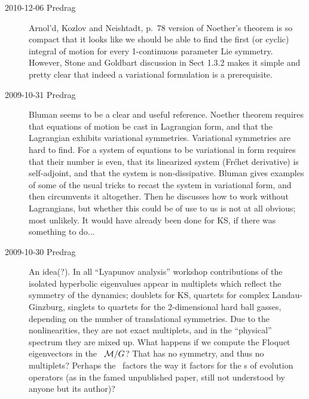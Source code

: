 \begin{description}
\item[2010-12-06 Predrag]
Arnol'd, Kozlov and Neishtadt, p.~78 version of
Noether's theorem is so compact that it looks like we should be able
to find the first (or cyclic) integral of motion for every 1-continuous
parameter Lie symmetry. However,
{Stone and Goldbart} discussion
in Sect 1.3.2 makes it simple and pretty clear that indeed a variational
formulation is a prerequisite.

\item[2009-10-31 Predrag] Bluman seems to be a clear
and useful reference. Noether
theorem requires that equations of motion be cast in Lagrangian form,
and that the Lagrangian exhibits variational symmetries.
Variational symmetries are hard to find. For a system of equations
to be variational in form requires that their number is even,
that its linearized system (Fr\'chet derivative) is self-adjoint,
and that the system is non-dissipative. Bluman gives examples of some
of the usual tricks to recast the system in variational form, and
then circumvents it altogether. Then he discusses how to work without
Lagrangians, but whether this could be of use to us is not at all obvious;
most unlikely. It would have already been done for KS, if there
was something to do...

\item[2009-10-30 Predrag] An idea(?). In all ``Lyapunov
analysis'' workshop contributions of  the
isolated hyperbolic eigenvalues appear in multiplets which
reflect the symmetry of the dynamics; doublets for KS, quartets
for complex Landau-Ginzburg, singlets to quartets for the
2-dimensional hard ball gasses, depending on the number of
translational symmetries. Due to the nonlinearities, they are
not exact multiplets, and in the ``physical'' spectrum they are
mixed up. What happens if we compute the Floquet eigenvectors
in the \reducedsp\ ${\cal M}/G$? That has no symmetry, and thus
no multiplets? Perhaps the \monodromyM\ factors the way it
factors for the \Fd s of evolution operators (as in the famed
unpublished paper, still not understood by anyone but its
author)?


\end{description}
